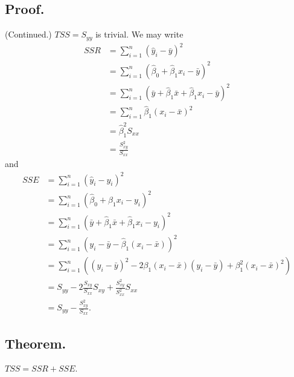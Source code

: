 \documentclass[titlepage]{article}
\begin{document}
\subsection{Proof.} (Continued.) $TSS = S_{yy}$ is trivial. We may write 
\begin{align*}
    SSR &= \sum_{i=1}^{n}(\hat{y}_{i}-\bar{y})^{2} \\
        &= \sum_{i=1}^{n}(\hat{\beta}_{0} + \hat{\beta}_{1}x_{i} - \bar{y})^{2} \\
        &= \sum_{i=1}^{n}(\bar{y} + \hat{\beta}_{1}\bar{x} + \hat{\beta}_{1}x_{i} - \bar{y})^{2} \\
        &= \sum_{i=1}^{n}\hat{\beta}_{1}(x_{i} - \bar{x})^{2} \\
        &= \hat{\beta}_{1}^{2}S_{xx} \\
        &= \frac{S_{xy}^{2}}{S_{xx}}
\end{align*}
and 
\begin{align*}
    SSE &= \sum_{i=1}^{n}(\hat{y}_{i} - y_{i})^{2} \\
        &= \sum_{i=1}^{n}(\hat{\beta}_{0} + \hat{\beta}_{1}x_{i} - y_{i})^{2} \\
        &= \sum_{i=1}^{n}(\bar{y} + \hat{\beta}_{1}\bar{x} + \hat{\beta}_{1}x_{i} - y_{i})^{2} \\
        &= \sum_{i=1}^{n}(y_{i} - \bar{y} - \hat{\beta}_{1}(x_{i} - \bar{x}))^{2} \\
        &= \sum_{i=1}^{n}((y_{i}-\bar{y})^{2} - 2\beta_{1}(x_{i}-\bar{x})(y_{i}-\bar{y}) + \beta_{1}^{2}(x_{i}-\bar{x})^{2}) \\
        &= S_{yy} - 2\frac{S_{xy}}{S_{xx}}S_{xy} + \frac{S_{xy}^{2}}{S_{xx}^{2}}S_{xx} \\
        &= S_{yy} - \frac{S_{xy}^{2}}{S_{xx}}.
\end{align*}

\subsection{Theorem.} $TSS = SSR + SSE$.
\end{document}
